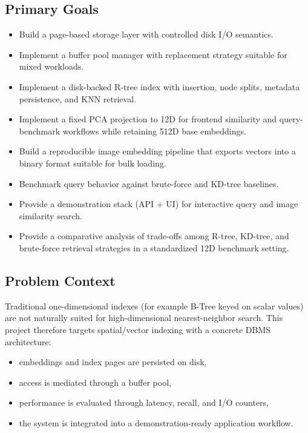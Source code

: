 \documentclass[11pt,a4paper]{article}
\begin{document}
\subsection{Primary Goals}

\begin{itemize}[leftmargin=1.5em]
  \item Build a page-based storage layer with controlled disk I/O semantics.
  \item Implement a buffer pool manager with replacement strategy suitable for mixed workloads.
  \item Implement a disk-backed R-tree index with insertion, node splits, metadata persistence, and KNN retrieval.
  \item Implement a fixed PCA projection to 12D for frontend similarity and query-benchmark workflows while retaining 512D base embeddings.
  \item Build a reproducible image embedding pipeline that exports vectors into a binary format suitable for bulk loading.
  \item Benchmark query behavior against brute-force and KD-tree baselines.
  \item Provide a demonstration stack (API + UI) for interactive query and image similarity search.
  \item Provide a comparative analysis of trade-offs among R-tree, KD-tree, and brute-force retrieval strategies in a standardized 12D benchmark setting.
\end{itemize}

\subsection{Problem Context}

Traditional one-dimensional indexes (for example B-Tree keyed on scalar values) are not naturally suited for high-dimensional nearest-neighbor search. This project therefore targets spatial/vector indexing with a concrete DBMS architecture:

\begin{itemize}[leftmargin=1.5em]
  \item embeddings and index pages are persisted on disk,
  \item access is mediated through a buffer pool,
  \item performance is evaluated through latency, recall, and I/O counters,
  \item the system is integrated into a demonstration-ready application workflow.
\end{itemize}
\end{document}
